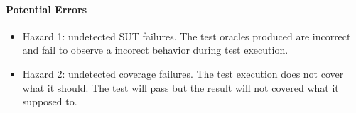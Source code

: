\paragraph{Potential Errors}
\begin{itemize}
\item Hazard 1: undetected SUT failures. The test oracles produced are
  incorrect and fail to observe a incorect behavior during test
  execution.
\item Hazard 2: undetected coverage failures. The test execution does
  not cover what it should. The test will pass but the result will not
  covered what it supposed to.
\end{itemize}


